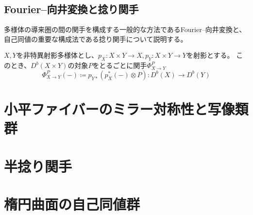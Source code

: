 \documentclass[uplatex,a4paper,dvipdfmx]{jsarticle}
\theoremstyle{plain}
\theoremstyle{definition}
\begin{document}
\subsection{Fourier--向井変換と捻り関手}
多様体の導来圏の間の関手を構成する一般的な方法であるFourier--向井変換と、自己同値の重要な構成法である捻り関手について説明する。

$X, Y$を非特異射影多様体とし、$p_X \colon X\times Y \to X, p_Y \colon X \times Y \to Y$を射影とする。
このとき、$D^b(X \times Y)$の対象$P$をとるごとに関手$\Phi^P_{X \to Y}$
\begin{equation}
	\Phi^P_{X \to Y}(-) \coloneqq p_{Y*}(p_X^*(-) \otimes P)\colon D^b(X) \to D^b(Y)
\end{equation}
\section{小平ファイバーのミラー対称性と写像類群}

\section{半捻り関手}

\section{楕円曲面の自己同値群}




\end{document}
